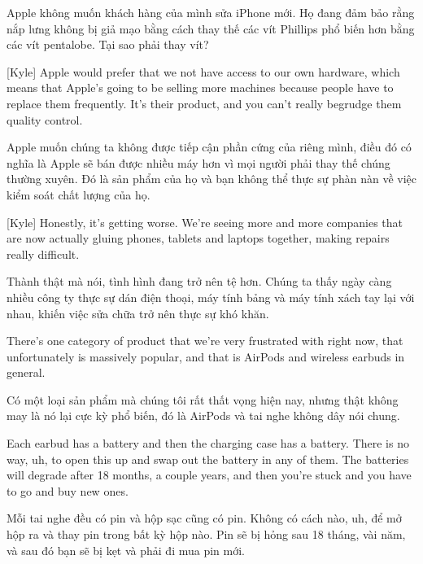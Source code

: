 \documentclass[a4paper]{article}
\begin{document}
	\begin{vietnamese-v2}
		 Apple không muốn khách hàng của mình sửa iPhone mới.
		Họ đang đảm bảo rằng nắp lưng không bị giả mạo bằng cách thay thế các vít Phillips phổ biến hơn bằng các vít pentalobe.
		Tại sao phải thay vít?
	\end{vietnamese-v2}
	
	[Kyle] Apple would prefer that we not have access to our own hardware, which means that Apple's going to be selling more machines because people have to replace them frequently. It's their product, and you can't really begrudge them quality control.
	
	\begin{vietnamese-v2}
		[Kyle] Apple muốn chúng ta không được tiếp cận phần cứng của riêng mình, điều đó có nghĩa là Apple sẽ bán được nhiều máy hơn vì mọi người phải thay thế chúng thường xuyên. Đó là sản phẩm của họ và bạn không thể thực sự phàn nàn về việc kiểm soát chất lượng của họ.
	\end{vietnamese-v2}
	
	[Kyle] Honestly, it's getting worse. We're seeing more and more companies that are now actually gluing phones, tablets and laptops together, making repairs really difficult.
	
	\begin{vietnamese-v2}
		[Kyle] Thành thật mà nói, tình hình đang trở nên tệ hơn. Chúng ta thấy ngày càng nhiều công ty thực sự dán điện thoại, máy tính bảng và máy tính xách tay lại với nhau, khiến việc sửa chữa trở nên thực sự khó khăn.
	\end{vietnamese-v2}
	
	There's one category of product that we're very frustrated with right now, that unfortunately is massively popular, and that is AirPods and wireless earbuds in general.
	
	\begin{vietnamese-v2}
		Có một loại sản phẩm mà chúng tôi rất thất vọng hiện nay, nhưng thật không may là nó lại cực kỳ phổ biến, đó là AirPods và tai nghe không dây nói chung.
	\end{vietnamese-v2}
	
	Each earbud has a battery and then the charging case has a battery.
	There is no way, uh, to open this up and swap out the battery in any of them.
	The batteries will degrade after 18 months, a couple years, and then you're stuck and you have to go and buy new ones.
	
	\begin{vietnamese-v2}
		Mỗi tai nghe đều có pin và hộp sạc cũng có pin.
		Không có cách nào, uh, để mở hộp ra và thay pin trong bất kỳ hộp nào.
		Pin sẽ bị hỏng sau 18 tháng, vài năm, và sau đó bạn sẽ bị kẹt và phải đi mua pin mới.
	\end{vietnamese-v2}
	
\end{document}
